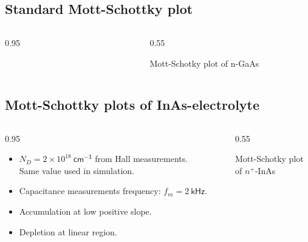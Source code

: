 \documentclass[final]{beamer}
\newcommand{\figfont}{\normalsize} %
\begin{document}
\begin{poster}
\subsection{Standard Mott-Schottky plot}
\newcommand{\figwidth}{0.55\columnwidth}
\begin{columns}[c]
    \begin{column}{0.95\columnwidth-\figwidth}

    \end{column}
    
    \begin{column}{0.005\columnwidth}
    \end{column}
    
    \begin{column}{\figwidth}
        \centering
        \figfont
        
        \caption{Mott-Schotky plot of n-GaAs}  
    \end{column}
\end{columns}	

\subsection{Mott-Schottky plots of InAs-electrolyte}
\begin{columns}[c]
        \begin{column}{0.95\columnwidth-\figwidth}
                \begin{itemize}   \itemsep20pt       
                    \item $N_D = 2\times10^{18}\ \mathsf{cm^{-3}}$ from Hall measurements. Same value used in simulation.
                    \item Capacitance measurements frequency: $f_m=2\ \mathsf{kHz}$.
                    \item Accumulation at low positive slope.
                    \item Depletion at linear region.
                \end{itemize}
        \end{column}
        
        \begin{column}{0.005\columnwidth}
        \end{column}
        
        \begin{column}{\figwidth}
           \centering
           \figfont
           
           \caption{Mott-Schotky plot of $n^+\!$-InAs}  
        \end{column}
\end{columns}
   

\end{poster}
\end{document}
